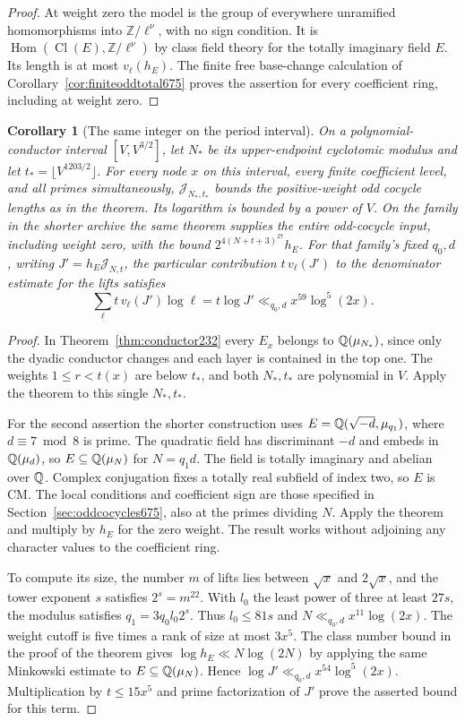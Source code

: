 \documentclass[a4paper,11pt]{article}
\newtheorem{corollary}[proposition]{Corollary}
\theoremstyle{definition}
\theoremstyle{remark}
\newcommand{\ZZ}{\mathbb Z}\newcommand{\ord}{\operatorname{ord}}
\numberwithin{equation}{section}
\newcommand{\Cl}{\operatorname{Cl}}
\begin{document}
\begin{proof}
At weight zero the model is the group of everywhere
unramified homomorphisms into \(\ZZ/\ell^\nu\), with no sign
condition. It is \(\operatorname{Hom}(\Cl(E),\ZZ/\ell^\nu)\)
by class field theory for the totally imaginary field \(E\).
Its length is at most \(v_\ell(h_E)\). The finite free
base-change calculation of Corollary~\ref{cor:finiteoddtotal675}
proves the assertion for every coefficient ring, including at
weight zero.
\end{proof}

\begin{corollary}[The same integer on the period interval]
\leavevmode\label{cor:oddwindow677}
On a polynomial-conductor interval \([V,V^{3/2}]\), let \(N_*\)
be its upper-endpoint cyclotomic modulus and let
\(t_*=\lfloor V^{1203/2}\rfloor\). For every node \(x\) on
this interval, every finite coefficient level, and all primes
simultaneously, \(\mathcal J_{N_*,t_*}\) bounds the positive-weight
odd cocycle lengths as in the theorem. Its logarithm is bounded
by a power of \(V\). On the family in the shorter archive the
same theorem supplies the entire odd-cocycle input, including
weight zero, with the bound \(2^{4(N+t+3)^{27}} h_E\).
For that family's fixed \(q_0,d\), writing
\(J'=h_E\mathcal J_{N,t}\), the particular contribution
\(t\,v_\ell(J')\) to the denominator estimate for the lifts
satisfies
\[
        \sum_\ell t\,v_\ell(J')\log\ell
          =t\log J'\ll_{q_0,d}x^{59}\log^5(2x).
\]
\end{corollary}
\begin{proof}
In Theorem~\ref{thm:conductor232} every \(E_x\) belongs to
\(\mathbb Q(\mu_{N_*})\), since only the dyadic conductor changes
and each layer is contained in the top one. The weights
\(1\le r<t(x)\) are below \(t_*\), and both \(N_*,t_*\) are
polynomial in \(V\). Apply the theorem to this single \(N_*,t_*\).

For the second assertion the shorter construction uses
\(E=\mathbb Q(\sqrt{-d},\mu_{q_1})\), where \(d\equiv7\bmod 8\)
is prime. The quadratic field has discriminant \(-d\) and
embeds in \(\mathbb Q(\mu_d)\), so \(E\subseteq\mathbb Q(\mu_N)\) for
\(N=q_1d\). The field is totally imaginary and abelian over
\(\mathbb Q\). Complex conjugation fixes a totally real subfield of
index two, so \(E\) is CM. The local conditions and coefficient sign are
those specified in Section~\ref{sec:oddcocycles675}, also at
the primes dividing \(N\). Apply the theorem and multiply by
\(h_E\) for the zero weight. The result works without adjoining
any character values to the coefficient ring.

To compute its size, the number \(m\) of lifts lies between
\(\sqrt x\) and \(2\sqrt x\), and the tower exponent \(s\)
satisfies \(2^s=m^{22}\). With \(l_0\) the least power of three
at least \(27s\), the modulus satisfies \(q_1=3q_0 l_0 2^s\).
Thus \(l_0\le81s\) and \(N\ll_{q_0,d}x^{11}\log(2x)\).
The weight cutoff is five times a rank of size at most \(3x^5\).
The class number bound in the proof of the theorem gives
\(\log h_E\ll N\log(2N)\) by applying the same Minkowski estimate
to \(E\subseteq\mathbb Q(\mu_N)\). Hence \(\log J'\ll_{q_0,d}
x^{54}\log^5(2x)\). Multiplication by \(t\le15x^5\) and prime
factorization of \(J'\) prove the asserted bound for this term.
\end{proof}
\end{document}
